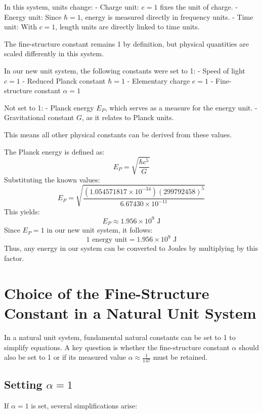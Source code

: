 \documentclass{article}
\begin{document}
	In this system, units change:
	- Charge unit: \( e = 1 \) fixes the unit of charge.
	- Energy unit: Since \( \hbar = 1 \), energy is measured directly in frequency units.
	- Time unit: With \( c = 1 \), length units are directly linked to time units.
	
	The fine-structure constant remains 1 by definition, but physical quantities are scaled differently in this system.
	
	In our new unit system, the following constants were set to 1:
	- Speed of light \( c = 1 \)
	- Reduced Planck constant \( \hbar = 1 \)
	- Elementary charge \( e = 1 \)
	- Fine-structure constant \( \alpha = 1 \)
	
	Not set to 1:
	- Planck energy \( E_P \), which serves as a measure for the energy unit.
	- Gravitational constant \( G \), as it relates to Planck units.
	
	This means all other physical constants can be derived from these values.
	
	The Planck energy is defined as:
	\[
	E_P = \sqrt{\frac{\hbar c^5}{G}}
	\]
	Substituting the known values:
	\[
	E_P = \sqrt{\frac{(1.054571817 \times 10^{-34}) (299792458)^5}{6.67430 \times 10^{-11}}}
	\]
	This yields:
	\[
	E_P \approx 1.956 \times 10^9 \text{ J}
	\]
	Since \( E_P = 1 \) in our new unit system, it follows:
	\[
	1 \text{ energy unit} = 1.956 \times 10^9 \text{ J}
	\]
	Thus, any energy in our system can be converted to Joules by multiplying by this factor.
	
	\section*{Choice of the Fine-Structure Constant in a Natural Unit System}
	
	In a natural unit system, fundamental natural constants can be set to 1 to simplify equations. A key question is whether the fine-structure constant \( \alpha \) should also be set to 1 or if its measured value \( \alpha \approx \frac{1}{137} \) must be retained.
	
	\subsection*{Setting \( \alpha = 1 \)}
	
	If \( \alpha = 1 \) is set, several simplifications arise:
	
\end{document}
